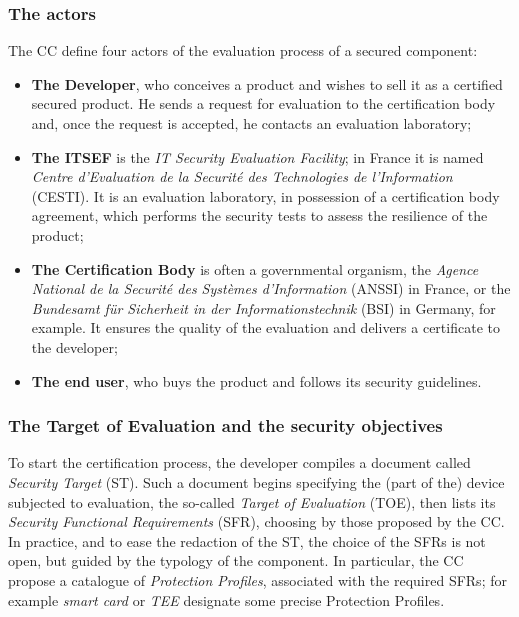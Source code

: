 \subsubsection{The actors} The CC define four actors of the evaluation process of a secured component:
\begin{itemize}
\item \textbf{The Developer}, who conceives a product and wishes to sell it as a certified secured product. He sends a request for evaluation to the certification body and, once the request is accepted, he contacts an evaluation laboratory;
\item \textbf{The ITSEF} is the \emph{IT Security Evaluation Facility}; in France it is named \emph{Centre d'Evaluation de la Securit\'e des Technologies de l'Information} (CESTI). It is an evaluation laboratory, in possession of a certification body agreement, which performs the security tests to assess the resilience of the product;
\item \textbf{The Certification Body} is often a governmental organism, the \emph{Agence National de la Securit\'e des Syst\`emes d'Information} (ANSSI) in France, or the \emph{Bundesamt f\"ur Sicherheit in der Informationstechnik} (BSI) in Germany, for example. It ensures the quality of the evaluation and delivers a certificate to the developer;
\item \textbf{The end user}, who buys the product and follows its security guidelines.
\end{itemize} 

\subsubsection{The Target of Evaluation and the security objectives} 
To start the certification process, the developer compiles a document called \emph{Security Target} (ST). Such a document begins specifying the (part of the) device subjected to evaluation, the so-called \emph{Target of Evaluation} (TOE), then lists its \emph{Security Functional Requirements} (SFR), choosing by those proposed by the CC. In practice, and to ease the redaction of the ST, the choice of the SFRs is not open, but guided by the typology of the component. In particular, the CC propose a catalogue of \emph{Protection Profiles}, associated with the required SFRs; for example \emph{smart card} or \emph{TEE} designate some precise Protection Profiles. 

